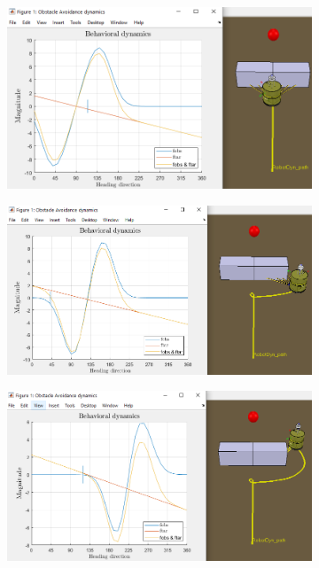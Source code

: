 \begin{figure}[htb!]
\begin{subfigure}{.45\textwidth}
    \includegraphics[width=\textwidth]{img/4-3.PNG}%
  \caption{}%
  \label{fig:obs-tar-linear-behavioral-3}
  \end{subfigure}
  \begin{subfigure}{.45\textwidth}
    \includegraphics[width=\textwidth]{img/4-5.PNG}%
  \caption{}%
  \label{fig:obs-tar-linear-behavioral-4}
  \end{subfigure}
  \begin{subfigure}{.45\textwidth}
    \includegraphics[width=\textwidth]{img/4-6.PNG}%

\end{subfigure}
\end{figure}
